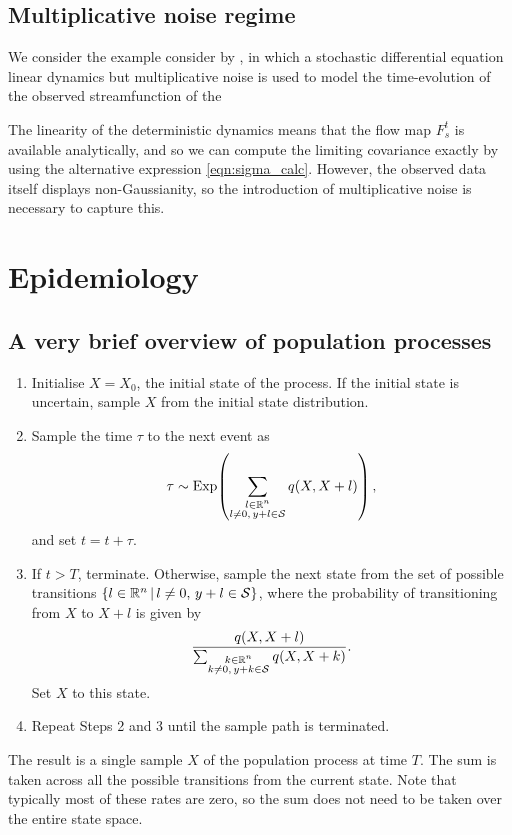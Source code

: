 \subsection{Multiplicative noise regime}


We consider the example consider by \citet{SuraEtAl_2005_MultiplicativeNoiseNonGaussianity}, in which a stochastic differential equation linear dynamics but multiplicative noise is used to model the time-evolution of the observed streamfunction of the

The linearity of the deterministic dynamics means that the flow map \(F_s^t\) is available analytically, and so we can compute the limiting covariance exactly by using the alternative expression \eqref{eqn:sigma_calc}.
However, the observed data itself displays non-Gaussianity, so the introduction of multiplicative noise is necessary to capture this.




\section{Epidemiology}


\subsection{A very brief overview of population processes}



\begin{enumerate}
	\item Initialise \(X = X_0\), the initial state of the process.
	      If the initial state is uncertain, sample \(X\) from the initial state distribution.

	\item Sample the time \(\tau\) to the next event as
	      \[
		      \tau \sim\mathrm{Exp}\!\left(\sum_{\substack{l \in \mathbb{R}^n \\ l \neq 0,\, y + l \in \mathcal{S}}}{q\!\left(X, X + l\right)}\right),
	      \]
	      and set \(t = t + \tau\).

	\item If \(t > T\), terminate.
	      Otherwise, sample the next state from the set of possible transitions \(\left\{l \in \mathbb{R}^n\,\middle|\,l \neq 0,\, y + l \in \mathcal{S}\right\}\), where the probability of transitioning from \(X\) to \(X + l\) is given by
	      \[
		      \frac{q\!\left(X, X + l\right)}{\sum_{\substack{k \in \mathbb{R}^n \\ k \neq 0,\, y + k \in \mathcal{S}}}{q\!\left(X, X + k\right)}}.
	      \]
	      Set \(X\) to this state.

	\item Repeat Steps 2 and 3 until the sample path is terminated.

\end{enumerate}
The result is a single sample \(X\) of the population process at time \(T\).
The sum is taken across all the possible transitions from the current state.
Note that typically most of these rates are zero, so the sum does not need to be taken over the entire state space.

